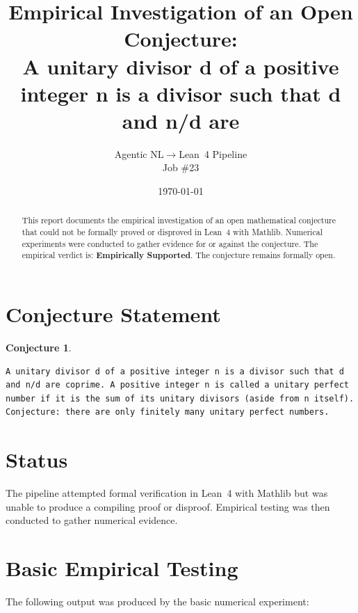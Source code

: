 \documentclass[11pt]{article}
\title{Empirical Investigation of an Open Conjecture:\\
A unitary divisor d of a positive integer n is a divisor such that d and n/d are}
\author{Agentic NL$\to$Lean~4 Pipeline \\ \small Job \#23}
\date{\today}
\newtheorem{conjecture}{Conjecture}
\begin{document}
\maketitle

\begin{abstract}
This report documents the empirical investigation of an open mathematical conjecture
that could not be formally proved or disproved in Lean~4 with Mathlib.
Numerical experiments were conducted to gather evidence for or against the conjecture.
The empirical verdict is: \textbf{\textcolor{green!70!black}{Empirically Supported}}.
The conjecture remains formally open.
\end{abstract}

\section{Conjecture Statement}

\begin{conjecture}
\begin{lstlisting}
A unitary divisor d of a positive integer n is a divisor such that d and n/d are coprime. A positive integer n is called a unitary perfect number if it is the sum of its unitary divisors (aside from n itself). Conjecture: there are only finitely many unitary perfect numbers.
\end{lstlisting}
\end{conjecture}

\section{Status}

\begin{center}
\end{center}

The pipeline attempted formal verification in Lean~4 with Mathlib but was unable to
produce a compiling proof or disproof. Empirical testing was then conducted to gather
numerical evidence.

\section{Basic Empirical Testing}

The following output was produced by the basic numerical experiment:
\end{document}
